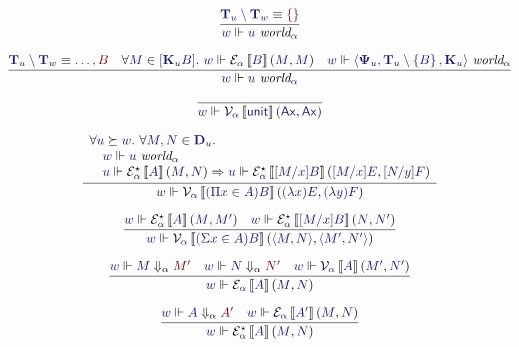 \documentclass[11pt]{amsart}
\theoremstyle{definition}
\theoremstyle{remark}
\numberwithin{equation}{section}
\def\InputModeColorName{MidnightBlue}
\def\OutputModeColorName{Maroon}
\newcommand\IMode[1]{{\color{\InputModeColorName}{#1}}}
\newcommand\OMode[1]{{\color{\OutputModeColorName}{#1}}}
\newcommand\Sem[1]{\left\llbracket \IMode{#1}\right\rrbracket}
\newcommand\Force[2]{\IMode{#1}\Vdash #2}
\newcommand\IsWorld[2]{\IMode{#1}\ \textit{world}_\IMode{#2}}
\newcommand\Match[2]{\IMode{#1}\equiv\OMode{#2}}
\newcommand\Val[2]{\mathcal{V}_{\IMode{#1}}\Sem{#2}}
\newcommand\IsVal[4]{\Val{#1}{#2}\left(\IMode{#3},\IMode{#4}\right)}
\newcommand\Exp[2]{\mathcal{E}_{\IMode{#1}}\Sem{#2}}
\newcommand\ExpStar[2]{\mathcal{E}_{\IMode{#1}}^\star\Sem{#2}}
\newcommand\IsExp[4]{\Exp{#1}{#2}\left(\IMode{#3},\IMode{#4}\right)}
\newcommand\IsExpStar[4]{\ExpStar{#1}{#2}\left(\IMode{#3},\IMode{#4}\right)}
\newcommand\SetLit[1]{\left\{#1\right\}}
\newcommand\Sig[1]{\mathbf{\Psi}_{#1}}
\newcommand\TyUnit{\mathsf{unit}}
\newcommand\TyDFun[3]{(\Pi #2 \in #1)#3}
\newcommand\TyDProd[3]{(\Sigma #2 \in #1)#3}
\newcommand\Ax{\mathsf{Ax}}
\newcommand\SuccEq[2]{\IMode{#1}\succeq\IMode{#2}}
\newcommand\Pair[2]{\left\langle #1, #2 \right\rangle}
\newcommand\Lam[2]{(\lambda #1)#2}
\newcommand\Member[2]{\IMode{#1} \in \IMode{#2}}
\newcommand\Eval[3]{\IMode{#2}\Downarrow_{#1}\OMode{#3}}
\newcommand\MkWorld[3]{\left\langle #1, #2, #3\right\rangle}
\newcommand\Ext[1]{\left[#1\right]}
\newcommand\Dom[1]{\mathbf{D}_{#1}}
\newcommand\Types[1]{\mathbf{T}_{#1}}
\newcommand\Witnesses[1]{\mathbf{K}_{#1}}
\begin{document}
\begin{gather*}
  \infer{
    \Force{w}{\IsWorld{u}{\alpha}}
  }{
    \Match{\Types{u}\setminus\Types{w}}{\SetLit{}}
  }\\[6pt]
  \infer{
    \Force{w}{\IsWorld{u}{\alpha}}
  }{
    \Match{\Types{u}\setminus\Types{w}}{\dots, B} &
    \forall\Member{M}{\Ext{\Witnesses{u}B}}.\ \Force{w}{\IsExp{\alpha}{B}{M}{M}} &
    \Force{w}{\IsWorld{\MkWorld{\Sig{u}}{\Types{u}\setminus\SetLit{B}}{\Witnesses{u}}}{\alpha}}
  }\\[6pt]
  \infer{
    \Force{w}{\IsVal{\alpha}{\TyUnit}{\Ax}{\Ax}}
  }{
  }\\[6pt]
  \infer{
    \Force{w}{\IsVal{\alpha}{\TyDFun{A}{x}{B}}{\Lam{x}{E}}{\Lam{y}{F}}}
  }{
    \begin{array}{l}
      \forall\SuccEq{u}{w}.\ \forall\Member{M,N}{\Dom{u}}.\\
      \quad\Force{w}{\IsWorld{u}{\alpha}}\\
      \quad\Force{u}{\IsExpStar{\alpha}{A}{M}{N}} \Rightarrow
            \Force{u}{\IsExpStar{\alpha}{[M/x]B}{[M/x]E}{[N/y]F}}
    \end{array}
  }\\[6pt]
  \infer{
    \Force{w}{\IsVal{\alpha}{\TyDProd{A}{x}{B}}{\Pair{M}{N}}{\Pair{M'}{N'}}}
  }{
    \Force{w}{\IsExpStar{\alpha}{A}{M}{M'}} &
    \Force{w}{\IsExpStar{\alpha}{[M/x]B}{N}{N'}}
  }\\[6pt]
  \infer{
    \Force{w}{\IsExp{\alpha}{A}{M}{N}}
  }{
    \Force{w}{\Eval{\alpha}{M}{M'}} &
    \Force{w}{\Eval{\alpha}{N}{N'}} &
    \Force{w}{\IsVal{\alpha}{A}{M'}{N'}}
  }\\[6pt]
  \infer{
    \Force{w}{\IsExpStar{\alpha}{A}{M}{N}}
  }{
    \Force{w}{\Eval{\alpha}{A}{A'}} &
    \Force{w}{\IsExp{\alpha}{A'}{M}{N}}
  }
\end{gather*}
\end{document}
